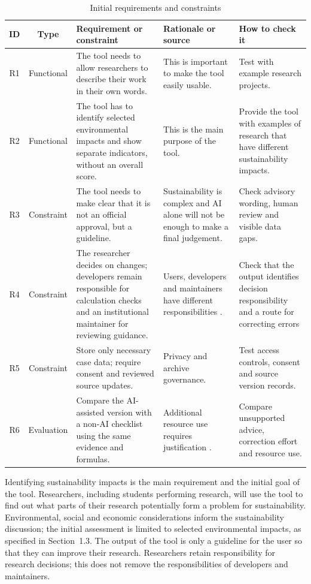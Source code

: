 \begin{table}[H]
\centering
\small
\begin{tabularx}{\textwidth}{|c|c|X|X|X|}
\hline
\textbf{ID} & \textbf{Type} & \textbf{Requirement or constraint} & 
\textbf{Rationale or source} & \textbf{How to check it} \\
\hline

R1 & Functional &
The tool needs to allow researchers to describe their work in their own words. &
This is important to make the tool easily usable. &
Test with example research projects. \\
\hline

R2 & Functional &
The tool has to identify selected environmental impacts and show separate indicators, without an overall score. &
This is the main purpose of the tool. &
Provide the tool with examples of research that have different sustainability impacts. \\
\hline

R3 & Constraint &
The tool needs to make clear that it is not an official approval, but a guideline. &
Sustainability is complex and AI alone will not be enough to make a final judgement. &
Check advisory wording, human review and visible data gaps.\\
\hline

R4 & Constraint &
The researcher decides on changes; developers remain responsible for calculation checks and an institutional maintainer for reviewing guidance. &
Users, developers and maintainers have different responsibilities \citep{santoni2018control}. &
Check that the output identifies decision responsibility and a route for correcting errors \\
\hline

R5 & Constraint & Store only necessary case data; require consent and reviewed source updates. & Privacy and archive governance. & Test access controls, consent and source version records. \\
\hline
R6 & Evaluation & Compare the AI-assisted version with a non-AI checklist using the same evidence and formulas. & Additional resource use requires justification \citep{lin2023cost}. & Compare unsupported advice, correction effort and resource use. \\
\hline

\end{tabularx}
\caption{Initial requirements and constraints}
\label{tab:requirements}
\end{table}

Identifying sustainability impacts is the main requirement and the initial goal of the tool. Researchers, including students performing research, will use the tool to find out what parts of their research potentially form a problem for sustainability. 
Environmental, social and economic considerations inform the sustainability discussion; the initial assessment is limited to selected environmental impacts, as specified in Section~1.3. The output of the tool is only a guideline for the user so that they can improve their research. Researchers retain responsibility for research decisions; this does not remove the responsibilities of developers and maintainers.

